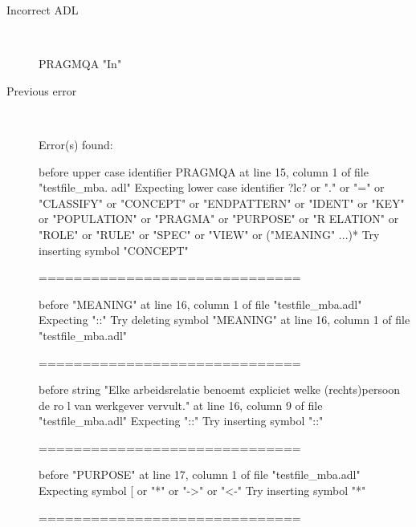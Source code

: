 \hrulefill

\begin{description}
  \item[Incorrect ADL]~\\
\begin{adl}
PRAGMQA "In"\end{adl}
  \item[Previous error]~\\
\begin{haskell}
Error(s) found:

before upper case identifier PRAGMQA at line 15, column 1 of file "testfile_mba.
adl"
Expecting lower case identifier ?lc? or "." or "=" or "CLASSIFY" or "CONCEPT" or
 "ENDPATTERN" or "IDENT" or "KEY" or "POPULATION" or "PRAGMA" or "PURPOSE" or "R
ELATION" or "ROLE" or "RULE" or "SPEC" or "VIEW" or ("MEANING" ...)*
Try inserting symbol "CONCEPT"

==============================

before "MEANING" at line 16, column 1 of file "testfile_mba.adl"
Expecting "::"
Try deleting symbol "MEANING" at line 16, column 1 of file "testfile_mba.adl"

==============================

before string "Elke arbeidsrelatie benoemt expliciet welke (rechts)persoon de ro
l van werkgever vervult." at line 16, column 9 of file "testfile_mba.adl"
Expecting "::"
Try inserting symbol "::"

==============================

before "PURPOSE" at line 17, column 1 of file "testfile_mba.adl"
Expecting symbol [ or "*" or "->" or "<-"
Try inserting symbol "*"

==============================


\end{haskell}
\end{description}
